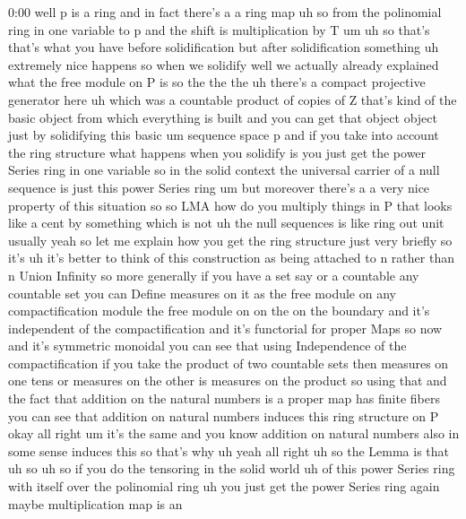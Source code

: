 \begin{unfinished}{0:00}
well  p  is  a  ring  and  in  fact  there's  a  a
ring  map
uh  so  from  the  polinomial  ring  in  one
variable  to  p  and  the  shift  is
multiplication  by
T
um  uh  so  that's  that's  what  you  have
before  solidification  but  after
solidification  something  uh  extremely
nice  happens  so  when  we
solidify  well  we  actually  already
explained  what  the  free  module  on  P  is
so  the  the  the  uh  there's  a  compact
projective  generator
here  uh  which  was  a  countable  product  of
copies  of  Z  that's  kind  of  the  basic
object  from  which  everything  is  built
and  you  can  get  that  object  object  just
by  solidifying  this  basic  um  sequence
space  p  and  if  you  take  into  account  the
ring  structure  what  happens  when  you
solidify  is  you  just  get  the  power
Series  ring  in  one
variable  so  in  the  solid  context  the
universal  carrier  of  a  null  sequence  is
just  this  power  Series  ring
um  but  moreover  there's  a  a  very  nice
property  of  this  situation  so  so  LMA  how
do  you  multiply  things  in  P  that  looks
like  a
cent  by  something  which  is  not  uh  the
null  sequences  is  like  ring  out  unit
usually  yeah  so  let  me  explain  how  you
get  the  ring  structure  just  very  briefly
so  it's  uh  it's  better  to  think  of  this
construction  as  being  attached  to  n
rather  than  n  Union  Infinity  so  more
generally  if  you  have  a  set  say  or  a
countable  any  countable  set  you  can
Define  measures  on  it  as  the  free  module
on  any  compactification  module  the  free
module  on  on  the  on  the  boundary  and
it's  independent  of  the
compactification  and  it's  functorial  for
proper
Maps  so  now  and  it's  symmetric  monoidal
you  can  see  that  using  Independence  of
the  compactification  if  you  take  the
product  of  two  countable  sets  then
measures  on  one  tens  or  measures  on  the
other  is  measures  on  the  product  so
using  that  and  the  fact  that  addition  on
the  natural  numbers  is  a  proper  map  has
finite  fibers  you  can  see  that  addition
on  natural  numbers  induces  this  ring
structure  on
P
okay  all  right  um  it's  the  same  and  you
know  addition  on  natural  numbers  also  in
some  sense  induces  this  so  that's  why  uh
yeah  all  right  uh  so  the  Lemma  is  that
uh
so
uh
so  if  you  do  the  tensoring  in  the  solid
world  uh  of  this  power  Series  ring  with
itself  over  the  polinomial  ring  uh  you
just  get  the  power  Series  ring  again
maybe  multiplication  map  is  an

\end{unfinished}
